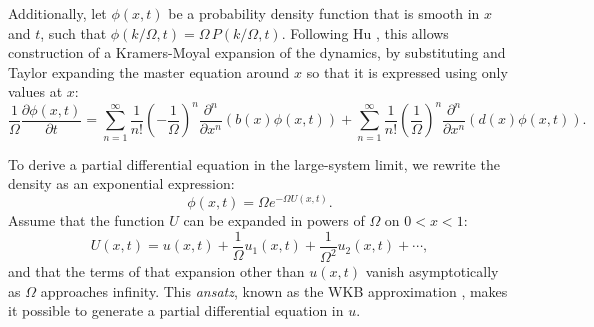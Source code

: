 \documentclass[review]{elsarticle}
\begin{document}
Additionally, let $\phi(x,t)$ be
a probability density function
that is smooth in $x$ and $t$, such that
$\phi(k/\Omega,t)=\Omega\,P(k/\Omega,t)$.
Following Hu \cite{hu_stationary_1987},
this allows construction of a Kramers-Moyal expansion
of the dynamics, by substituting and
Taylor expanding the master equation around $x$
so that it is expressed using only values at $x$:
\begin{dmath}[label=BD-KM]
 \frac1\Omega \frac{\partial \phi(x,t)}{\partial t} = \sum_{n=1}^\infty \frac1{n!} \left( - \frac1\Omega \right)^n \frac{\partial^n}{\partial x^n} \left( b(x) \phi(x,t) \right) + \sum_{n=1}^\infty \frac1{n!} \left( \frac1\Omega \right)^n \frac{\partial^n}{\partial x^n} \left( d(x) \phi(x,t) \right).
\end{dmath}

To derive a partial differential equation in the large-system limit,
we rewrite the density as an exponential expression:
\begin{dmath}[label=fs]
\phi(x,t) = \Omega e^{-\Omega U(x,t)}.
\end{dmath}
Assume that the function $U$ can be expanded in powers of $\Omega$
on $0<x<1$:
\begin{dmath*}
U(x,t) = u(x,t) + \frac1\Omega u_1(x,t) + \frac{1}{\Omega^2}u_2(x,t) + \cdots,
\end{dmath*}
and that the terms of that expansion
other than $u(x,t)$ vanish asymptotically as
$\Omega$ approaches infinity.
This \emph{ansatz}, known as the WKB approximation
\cite{hu_stationary_1987,bender_orzag_1978},
makes it possible to generate a partial differential equation in $u$.
\end{document}
